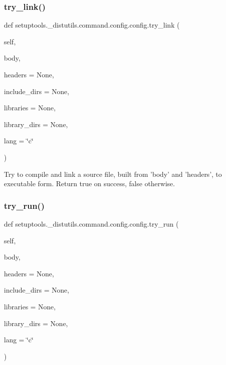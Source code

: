 \subsubsection{\texorpdfstring{try\+\_\+link()}{try\_link()}}
{\footnotesize\ttfamily def setuptools.\+\_\+distutils.\+command.\+config.\+config.\+try\+\_\+link (\begin{DoxyParamCaption}\item[{}]{self,  }\item[{}]{body,  }\item[{}]{headers = {\ttfamily None},  }\item[{}]{include\+\_\+dirs = {\ttfamily None},  }\item[{}]{libraries = {\ttfamily None},  }\item[{}]{library\+\_\+dirs = {\ttfamily None},  }\item[{}]{lang = {\ttfamily \char`\"{}c\char`\"{}} }\end{DoxyParamCaption})}

\begin{DoxyVerb}Try to compile and link a source file, built from 'body' and
'headers', to executable form.  Return true on success, false
otherwise.
\end{DoxyVerb}
 \mbox{\label{classsetuptools_1_1__distutils_1_1command_1_1config_1_1config_ad8eceb51041d9033b882ccca73c34add}} 
\subsubsection{\texorpdfstring{try\+\_\+run()}{try\_run()}}
{\footnotesize\ttfamily def setuptools.\+\_\+distutils.\+command.\+config.\+config.\+try\+\_\+run (\begin{DoxyParamCaption}\item[{}]{self,  }\item[{}]{body,  }\item[{}]{headers = {\ttfamily None},  }\item[{}]{include\+\_\+dirs = {\ttfamily None},  }\item[{}]{libraries = {\ttfamily None},  }\item[{}]{library\+\_\+dirs = {\ttfamily None},  }\item[{}]{lang = {\ttfamily \char`\"{}c\char`\"{}} }\end{DoxyParamCaption})}

